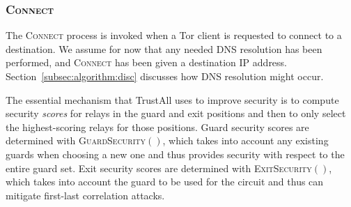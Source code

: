 \documentclass[conference]{styles/IEEEtran}
\begin{document}
\subsubsection{\textsc{Connect}}
The \textsc{Connect} process is invoked when a Tor client is requested to connect to a destination.
We assume for now that any needed DNS resolution has been performed, and \textsc{Connect} has been
given a destination IP address. Section~\ref{subsec:algorithm:disc} discusses how DNS resolution
might occur.

The essential mechanism that TrustAll uses to improve security is to compute security
\emph{scores} for relays in the guard and exit positions and then to only select the highest-scoring
relays for those positions. Guard security scores are determined with \textsc{GuardSecurity}$()$,
which takes into account any existing guards when choosing a new one and thus provides
security with respect to the entire guard set. Exit security scores are determined with
\textsc{ExitSecurity}$()$,
which takes into account the guard to be used for the circuit and thus can mitigate first-last
correlation attacks.
\end{document}
